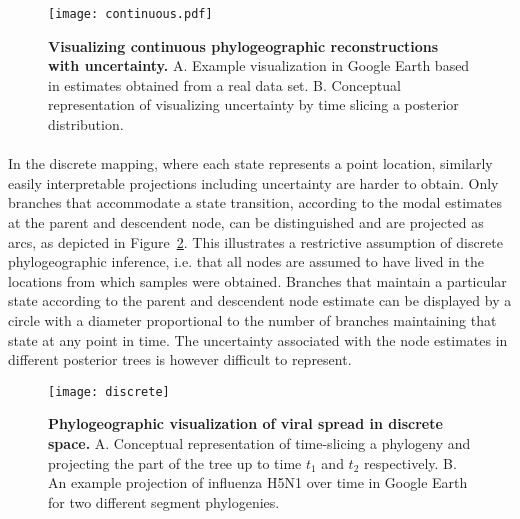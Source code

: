 \begin{figure}[H]
\centering
\texttt{[image: continuous.pdf]}
\caption{
{ \footnotesize 
{\bf Visualizing continuous phylogeographic reconstructions with uncertainty.} 
A. Example visualization in Google Earth based in estimates obtained from a real data set. B. Conceptual representation of visualizing uncertainty by time slicing a posterior distribution.
} %
}
\label{fig:cont}
\end{figure}


\paragraph{}
In the discrete mapping, where each state represents a point location, similarly easily interpretable projections including uncertainty are harder to obtain.
Only branches that accommodate a state transition, according to the modal estimates at the parent and descendent node, can be distinguished and are projected as arcs, as depicted in Figure~\ref{fig:discrete}.
This illustrates a restrictive assumption of discrete phylogeographic inference, i.e. that all nodes are assumed to have lived in the locations from which samples were obtained.
Branches that maintain a particular state according to the parent and descendent node estimate can be displayed by a circle with a diameter proportional to the number of branches maintaining that state at any point in time.
The uncertainty associated with the node estimates in different posterior trees is however difficult to represent.

\begin{figure}[H]
\centering
\texttt{[image: discrete]}
\caption{
{ \footnotesize 
{\bf Phylogeographic visualization of viral spread in discrete space.} 
A. Conceptual representation of time-slicing a phylogeny and projecting the part of the tree up to time $t_{1}$ and $t_{2}$ respectively. 
B. An example projection of influenza H5N1 over time in Google Earth for two different segment phylogenies. %
} %
}
\label{fig:discrete}
\end{figure}

